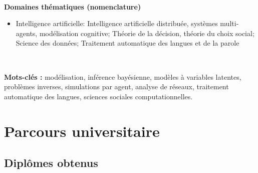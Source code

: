 \documentclass[11pt,a4paper]{article}
\begin{document}
\

\noindent\textbf{Domaines thématiques (nomenclature)}
\begin{itemize}[nosep]
    \item Intelligence artificielle: Intelligence artificielle distribuée, systèmes multi-agents, modélisation cognitive; Théorie de la décision, théorie du choix social; Science des données; Traitement automatique des langues et de la parole
\end{itemize}

\ 

\noindent\textbf{Mots-clés :} modélisation, inférence bayésienne, modèles à variables latentes, problèmes inverses, simulations par agent, analyse de réseaux, traitement automatique des langues, sciences sociales computationnelles.


\section{Parcours universitaire}

\subsection{Diplômes obtenus}
\end{document}
